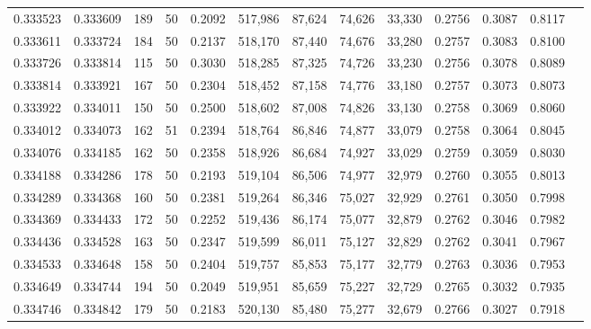 \begin{tabular}{rrrrrrrrrrrrr}
0.333523 & 0.333609 &   189 &  50 &                                     0.2092 & 517,986 &  87,624 &  74,626 &  33,330 & 0.2756 & 0.3087 & 0.8117 \\
0.333611 & 0.333724 &   184 &  50 &                                     0.2137 & 518,170 &  87,440 &  74,676 &  33,280 & 0.2757 & 0.3083 & 0.8100 \\
0.333726 & 0.333814 &   115 &  50 &                                     0.3030 & 518,285 &  87,325 &  74,726 &  33,230 & 0.2756 & 0.3078 & 0.8089 \\
0.333814 & 0.333921 &   167 &  50 &                                     0.2304 & 518,452 &  87,158 &  74,776 &  33,180 & 0.2757 & 0.3073 & 0.8073 \\
0.333922 & 0.334011 &   150 &  50 &                                     0.2500 & 518,602 &  87,008 &  74,826 &  33,130 & 0.2758 & 0.3069 & 0.8060 \\
0.334012 & 0.334073 &   162 &  51 &                                     0.2394 & 518,764 &  86,846 &  74,877 &  33,079 & 0.2758 & 0.3064 & 0.8045 \\
0.334076 & 0.334185 &   162 &  50 &                                     0.2358 & 518,926 &  86,684 &  74,927 &  33,029 & 0.2759 & 0.3059 & 0.8030 \\
0.334188 & 0.334286 &   178 &  50 &                                     0.2193 & 519,104 &  86,506 &  74,977 &  32,979 & 0.2760 & 0.3055 & 0.8013 \\
0.334289 & 0.334368 &   160 &  50 &                                     0.2381 & 519,264 &  86,346 &  75,027 &  32,929 & 0.2761 & 0.3050 & 0.7998 \\
0.334369 & 0.334433 &   172 &  50 &                                     0.2252 & 519,436 &  86,174 &  75,077 &  32,879 & 0.2762 & 0.3046 & 0.7982 \\
0.334436 & 0.334528 &   163 &  50 &                                     0.2347 & 519,599 &  86,011 &  75,127 &  32,829 & 0.2762 & 0.3041 & 0.7967 \\
0.334533 & 0.334648 &   158 &  50 &                                     0.2404 & 519,757 &  85,853 &  75,177 &  32,779 & 0.2763 & 0.3036 & 0.7953 \\
0.334649 & 0.334744 &   194 &  50 &                                     0.2049 & 519,951 &  85,659 &  75,227 &  32,729 & 0.2765 & 0.3032 & 0.7935 \\
0.334746 & 0.334842 &   179 &  50 &                                     0.2183 & 520,130 &  85,480 &  75,277 &  32,679 & 0.2766 & 0.3027 & 0.7918 \\

\end{tabular}
